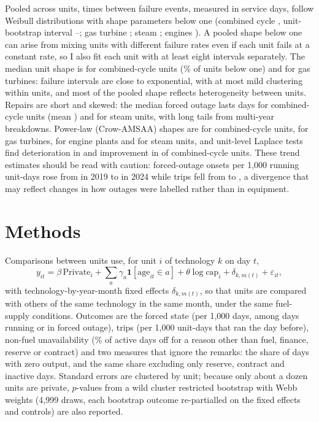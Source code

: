 \documentclass[11pt]{article}
\begin{document}
Pooled across units, times between failure events, measured in service days, follow Weibull distributions with shape parameters below one (combined cycle \wbCc, unit-bootstrap interval \wbBootCcLo--\wbBootCcHi; gas turbine \wbGt; steam \wbSt; engines \wbRe). A pooled shape below one can arise from mixing units with different failure rates even if each unit fails at a constant rate, so I also fit each unit with at least eight intervals separately. The median unit shape is \wbUnitCc{} for combined-cycle units (\wbUnitCcLt\% of \wbUnitCcN{} units below one) and \wbUnitGt{} for gas turbines: failure intervals are close to exponential, with at most mild clustering within units, and most of the pooled shape reflects heterogeneity between units. Repairs are short and skewed: the median forced outage lasts \ieeeCcMTTRmed{} days for combined-cycle units (mean \ieeeCcMTTRmean) and \ieeeStMTTRmed{} for steam units, with long tails from multi-year breakdowns. Power-law (Crow-AMSAA) shapes are \caCc{} for combined-cycle units, \caGt{} for gas turbines, \caRe{} for engine plants and \caSt{} for steam units, and unit-level Laplace tests find deterioration in \lapCcDet{} and improvement in \lapCcImp{} of \lapCcTested{} combined-cycle units. These trend estimates should be read with caution: forced-outage onsets per 1,000 running unit-days rose from \onsetRateNineteen{} in 2019 to \onsetRateTwentyFour{} in 2024 while trips fell from \tripRateNineteen{} to \tripRateTwentyFour, a divergence that may reflect changes in how outages were labelled rather than in equipment.

\section{Methods}

Comparisons between units use, for unit $i$ of technology $k$ on day $t$,
\begin{equation}
y_{it} = \beta\,\mathrm{Private}_i + \sum_a \gamma_a \mathbf{1}[\mathrm{age}_{it}\in a] + \theta \log \mathrm{cap}_i + \delta_{k,m(t)} + \varepsilon_{it},
\end{equation}
with technology-by-year-month fixed effects $\delta_{k,m(t)}$, so that units are compared with others of the same technology in the same month, under the same fuel-supply conditions. Outcomes are the forced state (per 1,000 days, among days running or in forced outage), trips (per 1,000 unit-days that ran the day before), non-fuel unavailability (\% of active days off for a reason other than fuel, finance, reserve or contract) and two measures that ignore the remarks: the share of days with zero output, and the same share excluding only reserve, contract and inactive days. Standard errors are clustered by unit; because only about a dozen units are private, $p$-values from a wild cluster restricted bootstrap with Webb weights (4,999 draws, each bootstrap outcome re-partialled on the fixed effects and controls) are also reported.
\end{document}
